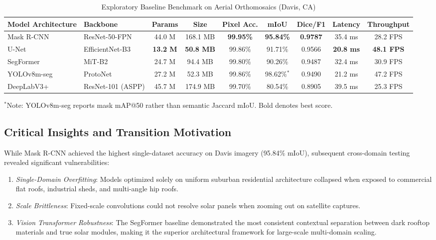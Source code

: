 \documentclass[conference]{IEEEtran}
\begin{document}
\begin{table}[t]
\centering
\caption{Exploratory Baseline Benchmark on Aerial Orthomosaics (Davis, CA)}
\label{tab:baseline}
\begin{tabular*}{\textwidth}{@{\extracolsep{\fill}}llccccccc@{}}
\toprule
\textbf{Model Architecture} & \textbf{Backbone} & \textbf{Params} & \textbf{Size} & \textbf{Pixel Acc.} & \textbf{mIoU} & \textbf{Dice/F1} & \textbf{Latency} & \textbf{Throughput} \\
\midrule
Mask R-CNN & ResNet-50-FPN & 44.0 M & 168.1 MB & \textbf{99.95\%} & \textbf{95.84\%} & \textbf{0.9787} & 35.4 ms & 28.2 FPS \\
U-Net & EfficientNet-B3 & \textbf{13.2 M} & \textbf{50.8 MB} & 99.86\% & 91.71\% & 0.9566 & \textbf{20.8 ms} & \textbf{48.1 FPS} \\
SegFormer & MiT-B2 & 24.7 M & 94.4 MB & 99.80\% & 90.26\% & 0.9487 & 32.4 ms & 30.9 FPS \\
YOLOv8m-seg & ProtoNet & 27.2 M & 52.3 MB & 99.86\% & 98.62\%$^*$ & 0.9490 & 21.2 ms & 47.2 FPS \\
DeepLabV3+ & ResNet-101 (ASPP) & 45.7 M & 174.9 MB & 99.70\% & 80.54\% & 0.8905 & 39.5 ms & 25.3 FPS \\
\bottomrule
\end{tabular*}
\vspace{1mm}
\raggedright\footnotesize{$^*$Note: YOLOv8m-seg reports mask mAP@50 rather than semantic Jaccard mIoU. Bold denotes best score.}
\end{table}

\subsection{Critical Insights and Transition Motivation}
While Mask R-CNN achieved the highest single-dataset accuracy on Davis imagery (95.84\% mIoU), subsequent cross-domain testing revealed significant vulnerabilities:
\begin{enumerate}
    \item \textit{Single-Domain Overfitting}: Models optimized solely on uniform suburban residential architecture collapsed when exposed to commercial flat roofs, industrial sheds, and multi-angle hip roofs.
    \item \textit{Scale Brittleness}: Fixed-scale convolutions could not resolve solar panels when zooming out on satellite captures.
    \item \textit{Vision Transformer Robustness}: The SegFormer baseline demonstrated the most consistent contextual separation between dark rooftop materials and true solar modules, making it the superior architectural framework for large-scale multi-domain scaling.
\end{enumerate}
\end{document}
